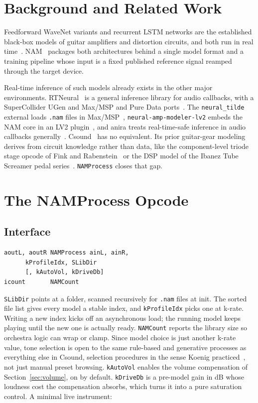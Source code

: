 \documentclass[runningheads,a4paper]{llncs}
\begin{document}
\section{Background and Related Work}

Feedforward WaveNet variants and recurrent LSTM networks are the
established black-box models of guitar amplifiers and distortion
circuits, and both run in real
time~\cite{damskagg2019tube,damskagg2019distortion,wright2019rnn,wright2020realtime,wright2020perceptual}.
NAM~\cite{atkinson2025slimmable,nam} packages both architectures behind
a single model format and a training pipeline whose input is a fixed
published reference signal reamped through the target device.

Real-time inference of such models already exists in the other major
environments. RTNeural~\cite{chowdhury2021rtneural} is a general
inference library for audio callbacks, with a SuperCollider UGen and
Max/MSP and Pure Data ports~\cite{pluta_rtneural}. The
\texttt{neural\_tilde} external loads \texttt{.nam} files in
Max/MSP~\cite{neuraltilde}, \texttt{neural-amp-modeler-lv2} embeds the
NAM core in an LV2 plugin~\cite{oliphantlv2}, and anira treats
real-time-safe inference in audio callbacks
generally~\cite{ackva2024anira}. Csound~\cite{lazzarini2016csound} has
no equivalent. Its prior guitar-gear modeling derives from circuit
knowledge rather than data, like the component-level triode stage opcode of
Fink and Rabenstein~\cite{fink2011triode} or the DSP model of the
Ibanez Tube Screamer pedal series~\cite{walsh2019tubescreamer}. \texttt{NAMProcess} closes that gap.

\section{The NAMProcess Opcode}
\label{sec:opcode}

\subsection{Interface}
\label{sec:interface}

\begin{verbatim}
aoutL, aoutR NAMProcess ainL, ainR,
      kProfileIdx, SLibDir
      [, kAutoVol, kDriveDb]
icount       NAMCount
\end{verbatim}

\texttt{SLibDir} points at a folder, scanned recursively for
\texttt{.nam} files at init. The sorted file list gives every model a
stable index, and \texttt{kProfileIdx} picks one at k-rate. Writing a
new index kicks off an asynchronous load; the running model keeps
playing until the new one is actually ready. \texttt{NAMCount} reports
the library size so orchestra logic can wrap or clamp. Since model
choice is just another k-rate value, tone selection is open to the same
rule-based and generative processes as everything else in Csound,
selection procedures in the sense Koenig
practiced~\cite{koenig1970project2}, not just manual preset browsing.
\texttt{kAutoVol} enables the volume compensation of
Section~\ref{sec:volume}, on by default. \texttt{kDriveDb} is a
pre-model gain in dB whose loudness cost the compensation absorbs,
which turns it into a pure saturation control. A minimal live
instrument:
\end{document}
